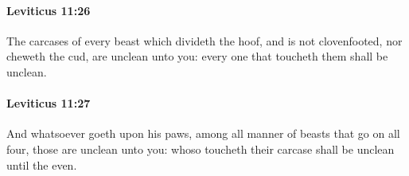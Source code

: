 		\paragraph{Leviticus 11:26} %
			\label{LEVITICUS-11-26}

			The carcases of every beast which divideth the hoof, and is not clovenfooted, nor cheweth the cud, are unclean unto you: every one that toucheth them shall be unclean.


		\paragraph{Leviticus 11:27} %
			\label{LEVITICUS-11-27}

			And whatsoever goeth upon his paws, among all manner of beasts that go on all four, those are unclean unto you: whoso toucheth their carcase shall be unclean until the even.


